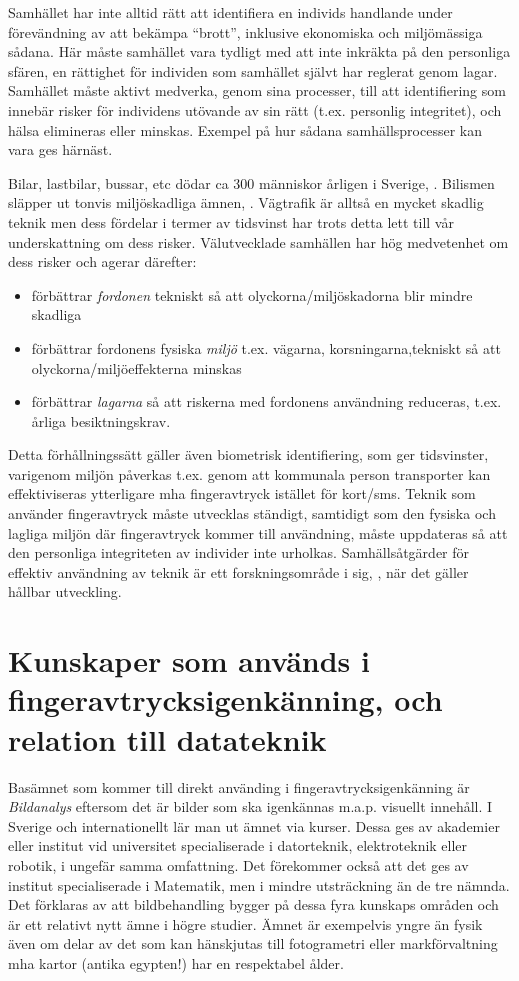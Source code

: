 \documentclass{article}
\begin{document}
Samhället har inte alltid rätt att identifiera en individs handlande under förevändning av att bekämpa ``brott'', inklusive ekonomiska och miljömässiga sådana. 
Här måste samhället vara tydligt med att inte inkräkta på
den personliga sfären, en rättighet för individen som samhället självt har reglerat genom lagar. Samhället måste aktivt medverka,
genom sina processer, till att identifiering som innebär
risker för individens utövande av sin rätt (t.ex. personlig integritet),
och hälsa elimineras eller minskas. Exempel på hur sådana samhällsprocesser kan vara ges härnäst.

Bilar, lastbilar, bussar, etc  dödar ca 300 människor årligen i Sverige,  \cite{webtransport}.
Bilismen släpper ut  tonvis  miljöskadliga ämnen, \cite{webutslapp}.
Vägtrafik är alltså en mycket skadlig teknik men dess fördelar i termer av tidsvinst har trots detta lett till vår underskattning om dess
risker. Välutvecklade samhällen har hög medvetenhet om dess risker och agerar därefter:
\begin{itemize}
\item förbättrar {\em fordonen}  tekniskt så att olyckorna/miljöskadorna blir mindre skadliga
\item  förbättrar fordonens fysiska {\em miljö } t.ex. vägarna, korsningarna,tekniskt så att olyckorna/miljöeffekterna minskas
\item förbättrar {\em lagarna}  så att riskerna med fordonens användning
  reduceras, t.ex. årliga besiktningskrav.
\end{itemize} 
Detta förhållningssätt gäller även biometrisk identifiering, som ger
tidsvinster, varigenom miljön påverkas t.ex. genom att kommunala
person transporter kan effektiviseras ytterligare mha fingeravtryck istället för kort/sms. Teknik
som använder fingeravtryck måste utvecklas ständigt, samtidigt som den
fysiska och lagliga miljön där fingeravtryck kommer till användning,
måste uppdateras så att den personliga integriteten av individer inte urholkas. Samhällsåtgärder för effektiv användning av teknik
är ett forskningsområde i sig, \cite{Cash08072003}, när det gäller
hållbar utveckling.
\section{Kunskaper som används i fingeravtrycksigenkänning, och
  relation till datateknik}
\label{sc:kunskap}
Basämnet som kommer till direkt använding i fingeravtrycksigenkänning
är {\em  Bildanalys } eftersom det är bilder som ska
igenkännas m.a.p. visuellt innehåll. I Sverige och internationellt lär man ut ämnet via kurser.   Dessa ges av akademier eller institut vid universitet specialiserade i datorteknik, elektroteknik eller robotik, i ungefär samma omfattning.
 Det förekommer också att det ges av institut
specialiserade i Matematik,  men i mindre utsträckning än de tre nämnda.
Det förklaras av att bildbehandling bygger på dessa fyra kunskaps
områden och är  ett relativt nytt ämne
 i  högre studier.  Ämnet är exempelvis yngre än fysik även om delar av det
 som kan hänskjutas till fotogrametri eller markförvaltning mha kartor
 (antika egypten!) har en respektabel ålder.
\end{document}

